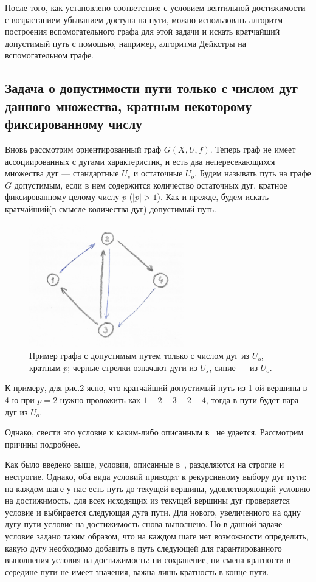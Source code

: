 	После того, как установлено соответствие с условием вентильной достижимости с возрастанием-убыванием доступа на пути, можно использовать алгоритм построения вспомогательного графа для этой задачи и искать кратчайший допустимый путь с помощью, например, алгоритма Дейкстры на вспомогательном графе. 
	
	\subsection{Задача о допустимости пути только с числом дуг данного множества, кратным некоторому фиксированному числу}
	
	Вновь рассмотрим ориентированный граф $G(X,U,f)$. Теперь граф не имеет ассоциированных с дугами характеристик, и есть два непересекающихся множества дуг --- стандартные $U_s$ и остаточные $U_o$. Будем называть путь на графе $G$ допустимым, если в нем содержится количество остаточных дуг, кратное фиксированному целому числу $p$ ($|p| > 1$). Как и прежде, будем искать кратчайший(в смысле количества дуг) допустимый путь.
	
	\begin{figure}
		\centering
		\includegraphics[width=0.6\textwidth]{img/2.png}
		\caption{Пример графа с допустимым путем только с числом дуг из $U_o$, кратным $p$; черные стрелки означают дуги из $U_s$, синие --- из $U_o$.}
		\label{fig:pic_2}
	\end{figure}
	
	К примеру, для рис.2 ясно, что кратчайший допустимый путь из 1-ой вершины в 4-ю при $p = 2$ нужно проложить как $1-2-3-2-4$, тогда в пути будет пара дуг из $U_o$.
	
	Однако, свести это условие к каким-либо описанным в~\autocite{Mono} не удается. Рассмотрим причины подробнее.
	
	Как было введено выше, условия, описанные в~\autocite{Mono}, разделяются на строгие и нестрогие. Однако, оба вида условий приводят к рекурсивному выбору дуг пути: на каждом шаге у нас есть путь до текущей вершины, удовлетворяющий условию на достижимость, для всех исходящих из текущей вершины дуг проверяется условие и выбирается следующая дуга пути. Для нового, увеличенного на одну дугу пути условие на достижимость снова выполнено. Но в данной задаче условие задано таким образом, что на каждом шаге нет возможности определить, какую дугу необходимо добавить в путь следующей для гарантированного выполнения условия на достижимость: ни сохранение, ни смена кратности в середине пути не имеет значения, важна лишь кратность в конце пути. 
	
